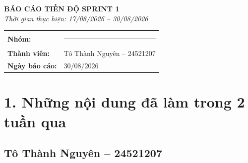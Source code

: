 \documentclass[12pt,a4paper]{article}
\begin{document}
\begin{center}
    {\Large\textbf{BÁO CÁO TIẾN ĐỘ SPRINT 1}}\\[0.5em]
    \textit{Thời gian thực hiện: 17/08/2026 -- 30/08/2026}
\end{center}

\vspace{1em}

\begin{tabular}{@{}>{\bfseries}p{4cm}p{10cm}@{}}
Nhóm:           & \rule{3cm}{0.4pt} \\[0.6em]
Thành viên:     & Tô Thành Nguyên -- 24521207 \\[0.6em]
Ngày báo cáo:   & 30/08/2026
\end{tabular}

\vspace{1.5em}

\section*{1. Những nội dung đã làm trong 2 tuần qua}

\subsection*{Tô Thành Nguyên -- 24521207}
\end{document}
